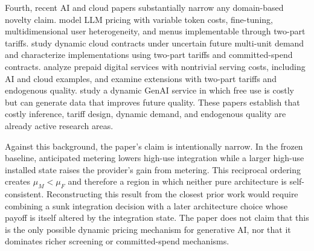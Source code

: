 Fourth, recent AI and cloud papers substantially narrow any domain-based novelty claim. \citet{bergemannbonattismolin2025} model LLM pricing with variable token costs, fine-tuning, multidimensional user heterogeneity, and menus implementable through two-part tariffs. \citet{bergemannwang2025} study dynamic cloud contracts under uncertain future multi-unit demand and characterize implementations using two-part tariffs and committed-spend contracts. \citet{bhaskaran2026} analyze prepaid digital services with nontrivial serving costs, including AI and cloud examples, and examine extensions with two-part tariffs and endogenous quality. \citet{bichuchyaish2026} study a dynamic GenAI service in which free use is costly but can generate data that improves future quality. These papers establish that costly inference, tariff design, dynamic demand, and endogenous quality are already active research areas.

Against this background, the paper's claim is intentionally narrow. In the frozen baseline, anticipated metering lowers high-use integration while a larger high-use installed state raises the provider's gain from metering. This reciprocal ordering creates $\mu_M<\mu_F$ and therefore a region in which neither pure architecture is self-consistent. Reconstructing this result from the closest prior work would require combining a sunk integration decision with a later architecture choice whose payoff is itself altered by the integration state. The paper does not claim that this is the only possible dynamic pricing mechanism for generative AI, nor that it dominates richer screening or committed-spend mechanisms.
